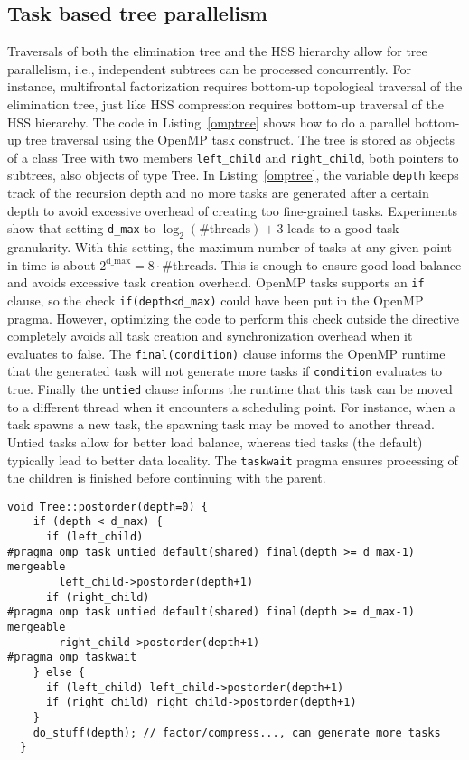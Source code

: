 \documentclass{article}
\begin{document}
\subsection{Task based tree parallelism}
Traversals of both the elimination tree and the HSS hierarchy allow
for tree parallelism, i.e., independent subtrees can be processed
concurrently. For instance, multifrontal factorization requires
bottom-up topological traversal of the elimination tree, just like HSS
compression requires bottom-up traversal of the HSS hierarchy. The
code in Listing~\ref{omptree} shows how to do a parallel bottom-up
tree traversal using the OpenMP task construct. The tree is stored as
objects of a class Tree with two members \verb+left_child+ and
\verb+right_child+, both pointers to subtrees, also objects of type
Tree. In Listing~\ref{omptree}, the variable \verb+depth+ keeps track
of the recursion depth and no more tasks are generated after a certain
depth to avoid excessive overhead of creating too fine-grained
tasks. Experiments show that setting \verb+d_max+ to
$\log_2(\#\textrm{threads})+3$ leads to a good task granularity. With
this setting, the maximum number of tasks at any given point in time
is about $2^{\textrm{d\_max}}=8 \cdot \#\textrm{threads}$. This is
enough to ensure good load balance and avoids excessive task creation
overhead. OpenMP tasks supports an \verb+if+ clause, so the check
\verb+if(depth<d_max)+ could have been put in the OpenMP
pragma. However, optimizing the code to perform this check outside the
directive completely avoids all task creation and synchronization
overhead when it evaluates to false. The \verb+final(condition)+
clause informs the OpenMP runtime that the generated task will not
generate more tasks if \verb+condition+ evaluates to true. Finally the
\verb+untied+ clause informs the runtime that this task can be moved
to a different thread when it encounters a scheduling point. For
instance, when a task spawns a new task, the spawning task may be
moved to another thread. Untied tasks allow for better load balance,
whereas tied tasks (the default) typically lead to better data
locality. The \verb+taskwait+ pragma ensures processing of the
children is finished before continuing with the parent.
\begin{lstlisting}[label=omptree,frame=single,captionpos=b,float,
  caption={Bottom-up topological parallel tree traversal implemented with recursion and the OpenMP~(3.1) task construct.}]
  void Tree::postorder(depth=0) {
    if (depth < d_max) {
      if (left_child)
#pragma omp task untied default(shared) final(depth >= d_max-1) mergeable
        left_child->postorder(depth+1)
      if (right_child)
#pragma omp task untied default(shared) final(depth >= d_max-1) mergeable
        right_child->postorder(depth+1)
#pragma omp taskwait
    } else {
      if (left_child) left_child->postorder(depth+1)
      if (right_child) right_child->postorder(depth+1)
    }
    do_stuff(depth); // factor/compress..., can generate more tasks
  }  
\end{lstlisting}
\end{document}
